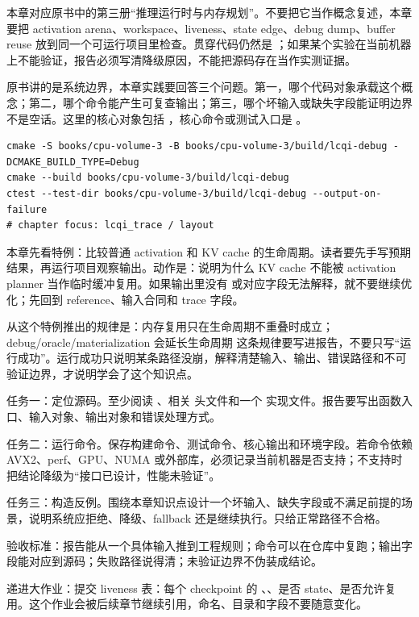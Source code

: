
本章对应原书中的第三册“推理运行时与内存规划”。不要把它当作概念复述，本章要把 activation arena、workspace、liveness、state edge、debug dump、buffer reuse 放到同一个可运行项目里检查。贯穿代码仍然是 ；如果某个实验在当前机器上不能验证，报告必须写清降级原因，不能把源码存在当作实测证据。


原书讲的是系统边界，本章实践要回答三个问题。第一，哪个代码对象承载这个概念；第二，哪个命令能产生可复查输出；第三，哪个坏输入或缺失字段能证明边界不是空话。这里的核心对象包括 ，核心命令或测试入口是 。

\begin{lstlisting}[numbers=none,caption={第 11 章实践：运行时内存计划、liveness 与 Workspace 的最小命令入口}]
cmake -S books/cpu-volume-3 -B books/cpu-volume-3/build/lcqi-debug -DCMAKE_BUILD_TYPE=Debug
cmake --build books/cpu-volume-3/build/lcqi-debug
ctest --test-dir books/cpu-volume-3/build/lcqi-debug --output-on-failure
# chapter focus: lcqi_trace / layout
\end{lstlisting}


本章先看特例：比较普通 activation 和 KV cache 的生命周期。读者要先手写预期结果，再运行项目观察输出。动作是：说明为什么 KV cache 不能被 activation planner 当作临时缓冲复用。如果输出里没有  或对应字段无法解释，就不要继续优化；先回到 reference、输入合同和 trace 字段。

从这个特例推出的规律是：内存复用只在生命周期不重叠时成立；debug/oracle/materialization 会延长生命周期 这条规律要写进报告，不要只写“运行成功”。运行成功只说明某条路径没崩，解释清楚输入、输出、错误路径和不可验证边界，才说明学会了这个知识点。


任务一：定位源码。至少阅读 、相关  头文件和一个  实现文件。报告要写出函数入口、输入对象、输出对象和错误处理方式。

任务二：运行命令。保存构建命令、测试命令、核心输出和环境字段。若命令依赖 AVX2、perf、GPU、NUMA 或外部库，必须记录当前机器是否支持；不支持时把结论降级为“接口已设计，性能未验证”。

任务三：构造反例。围绕本章知识点设计一个坏输入、缺失字段或不满足前提的场景，说明系统应拒绝、降级、fallback 还是继续执行。只给正常路径不合格。


验收标准：报告能从一个具体输入推到工程规则；命令可以在仓库中复跑；输出字段能对应到源码；失败路径说得清；未验证边界不伪装成结论。

递进大作业：提交 liveness 表：每个 checkpoint 的 、、是否 state、是否允许复用。这个作业会被后续章节继续引用，命名、目录和字段不要随意变化。

